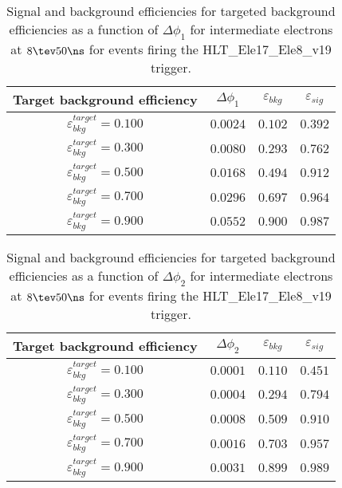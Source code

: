 \clearpage

\begin{table}[!bht]
  \begin{center}
    \begin{tabular}{cccc}
      \hline
      Target background efficiency & $\Delta\phi_1$ & $\varepsilon_{bkg}$ & $\varepsilon_{sig}$ \\ 
      \hline
      $\varepsilon_{bkg}^{target} = 0.100$ & $  0.0024$ & $0.102$ & $0.392$ \\
      $\varepsilon_{bkg}^{target} = 0.300$ & $  0.0080$ & $0.293$ & $0.762$ \\
      $\varepsilon_{bkg}^{target} = 0.500$ & $  0.0168$ & $0.494$ & $0.912$ \\
      $\varepsilon_{bkg}^{target} = 0.700$ & $  0.0296$ & $0.697$ & $0.964$ \\
      $\varepsilon_{bkg}^{target} = 0.900$ & $  0.0552$ & $0.900$ & $0.987$ \\
      \hline
    \end{tabular}
    \caption{Signal and background efficiencies for targeted background efficiencies as a function of $\Delta\phi_1$ for intermediate electrons at $8\tev 50\ns$ for events firing the HLT\_Ele17\_Ele8\_v19 trigger.}
    \label{tab:eff_rej_phi1_beam_8_50_trigger_17_8_I}
  \end{center}
\end{table}

\clearpage

\begin{table}[!bht]
  \begin{center}
    \begin{tabular}{cccc}
      \hline
      Target background efficiency & $\Delta\phi_2$ & $\varepsilon_{bkg}$ & $\varepsilon_{sig}$ \\ 
      \hline
      $\varepsilon_{bkg}^{target} = 0.100$ & $  0.0001$ & $0.110$ & $0.451$ \\
      $\varepsilon_{bkg}^{target} = 0.300$ & $  0.0004$ & $0.294$ & $0.794$ \\
      $\varepsilon_{bkg}^{target} = 0.500$ & $  0.0008$ & $0.509$ & $0.910$ \\
      $\varepsilon_{bkg}^{target} = 0.700$ & $  0.0016$ & $0.703$ & $0.957$ \\
      $\varepsilon_{bkg}^{target} = 0.900$ & $  0.0031$ & $0.899$ & $0.989$ \\
      \hline
    \end{tabular}
    \caption{Signal and background efficiencies for targeted background efficiencies as a function of $\Delta\phi_2$ for intermediate electrons at $8\tev 50\ns$ for events firing the HLT\_Ele17\_Ele8\_v19 trigger.}
    \label{tab:eff_rej_phi2_beam_8_50_trigger_17_8_I}
  \end{center}
\end{table}

